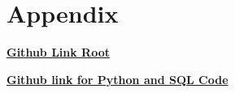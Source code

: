 \section{Appendix}
\noindent \href{https://github.com/sayed-ahmed-canada/public-data-code-the-effect-of-dietary-patterns-on-the-mortality-and-survival-of-ckd-patients} { \textbf{Github Link Root} }

\noindent \href{https://github.com/sayed-ahmed-canada/public-data-code-the-effect-of-dietary-patterns-on-the-mortality-and-survival-of-ckd-patients/tree/master/Python-or-R-codes} { \textbf{Github link for Python and SQL Code}} 

